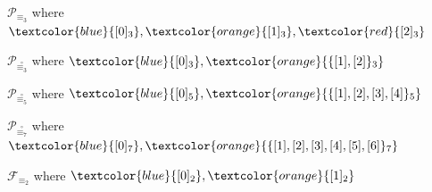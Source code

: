 \documentclass[10pt,serif, professionalfont]{beamer}
\begin{document}
\begin{frame}{$\mathcal{P}_{\equiv_{3}}$ where 
    $\textcolor{blue}{[0]_{3}},\textcolor{orange}{[1]_{3}},\textcolor{red}{[2]_{3}}$}

    
\end{frame}
\begin{frame}{$\mathcal{P}_{\stackrel{\circ}{\equiv_{3}}}$ where 
    $\textcolor{blue}{[0]_{3}},\textcolor{orange}{\lbrace [1],[2] \rbrace_{3}}$}

    
\end{frame}
\begin{frame}{$\mathcal{P}_{\stackrel{\circ}{\equiv_{5}}}$ where 
    $\textcolor{blue}{[0]_{5}},\textcolor{orange}{\lbrace [1],[2],[3],[4] \rbrace_{5}}$}

    
\end{frame}
\begin{frame}{$\mathcal{P}_{\stackrel{\circ}{\equiv_{7}}}$ where 
    $\textcolor{blue}{[0]_{7}},\textcolor{orange}{\lbrace [1],[2],[3],[4],[5],[6] \rbrace_{7}}$}

    
\end{frame}


\begin{frame}{$\mathcal{F}_{\equiv_{2}}$ where 
    $\textcolor{blue}{[0]_{2}},\textcolor{orange}{[1]_{2}}$}

    
\end{frame}
\end{document}
